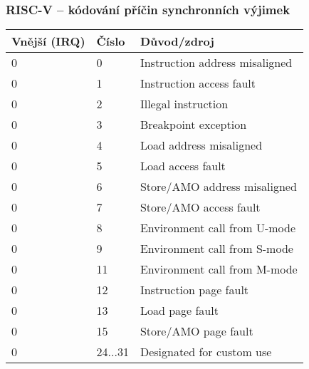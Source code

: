 \documentclass{beamer}
\begin{document}
\begin{frame}
\frametitle{RISC-V -- kódování příčin synchronních výjimek}

\begin{center}
\small
\begin{tabular}{|l|l|l|}  \hline
Vnější (IRQ) & Číslo & Důvod/zdroj \\\hline
0 & 0 &Instruction address misaligned \\\hline
0 & 1 & Instruction access fault \\\hline
0 & 2 & Illegal instruction \\\hline
0 & 3 & Breakpoint exception \\\hline
0 & 4 & Load address misaligned \\\hline
0 & 5 & Load access fault \\\hline
0 & 6 & Store/AMO address misaligned \\\hline
0 & 7 & Store/AMO access fault \\\hline
0 & 8 & Environment call from U-mode \\\hline
0 & 9 & Environment call from S-mode \\\hline
0 & 11 & Environment call from M-mode \\\hline
0 & 12 & Instruction page fault \\\hline
0 & 13 & Load page fault \\\hline
0 & 15 & Store/AMO page fault \\\hline
0 & 24...31 &Designated for custom use \\\hline
\end{tabular}
\end{center}
\end{frame}
\end{document}
